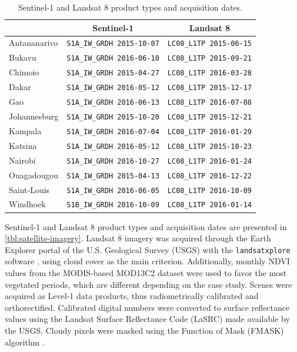 \documentclass[remotesensing,article,submit,moreauthors,pdftex,10pt,a4paper]{Definitions/mdpi}
\begin{document}
\begin{table}[H]
	\caption{Sentinel-1 and Landsat 8 product types and acquisition dates.}
	\centering
	\label{tbl:satellite-imagery}
	\begin{tabular}{lcc}
		\toprule
		             & \textbf{Sentinel-1}                & \textbf{Landsat 8} \\
		\midrule
		Antananarivo & \texttt{S1A\_IW\_GRDH\ 2015-10-07} &                    
		\texttt{LC08\_L1TP\ 2015-06-15}\tabularnewline
		Bukavu       & \texttt{S1A\_IW\_GRDH\ 2016-06-10} &                    
		\texttt{LC08\_L1TP\ 2015-09-21}\tabularnewline
		Chimoio      & \texttt{S1A\_IW\_GRDH\ 2015-04-27} &                    
		\texttt{LC08\_L1TP\ 2016-03-28}\tabularnewline
		Dakar        & \texttt{S1A\_IW\_GRDH\ 2016-05-12} &                    
		\texttt{LC08\_L1TP\ 2015-12-17}\tabularnewline
		Gao          & \texttt{S1A\_IW\_GRDH\ 2016-06-13} &                    
		\texttt{LC08\_L1TP\ 2016-07-08}\tabularnewline
		Johannesburg & \texttt{S1A\_IW\_GRDH\ 2015-10-20} &                    
		\texttt{LC08\_L1TP\ 2015-12-21}\tabularnewline
		Kampala      & \texttt{S1A\_IW\_GRDH\ 2016-07-04} &                    
		\texttt{LC08\_L1TP\ 2016-01-29}\tabularnewline
		Katsina      & \texttt{S1A\_IW\_GRDH\ 2016-05-12} &                    
		\texttt{LC08\_L1TP\ 2015-10-23}\tabularnewline
		Nairobi      & \texttt{S1A\_IW\_GRDH\ 2016-10-27} &                    
		\texttt{LC08\_L1TP\ 2016-01-24}\tabularnewline
		Ouagadougou  & \texttt{S1A\_IW\_GRDH\ 2015-04-13} &                    
		\texttt{LC08\_L1TP\ 2016-12-22}\tabularnewline
		Saint-Louis  & \texttt{S1A\_IW\_GRDH\ 2016-06-05} &                    
		\texttt{LC08\_L1TP\ 2016-10-09}\tabularnewline
		Windhoek     & \texttt{S1B\_IW\_GRDH\ 2016-10-09} &                    
		\texttt{LC08\_L1TP\ 2016-01-14}\tabularnewline
		\bottomrule
	\end{tabular}
\end{table}

Sentinel-1 and Landsat 8 product types and acquisition dates are presented in
\autoref{tbl:satellite-imagery}. Landsat 8 imagery was acquired through the
Earth Explorer portal of the U.S. Geological Survey (USGS) with the
\texttt{landsatxplore} software \cite{Forget2018}, using cloud cover as the main
criterion. Additionally, monthly NDVI values from the MODIS-based MOD13C2
dataset \cite{Didan2015} were used to favor the most vegetated periods, which
are different depending on the case study. Scenes were acquired as Level-1 data
products, thus radiometrically calibrated and orthorectified. Calibrated digital
numbers were converted to surface reflectance values using the Landsat Surface
Reflectance Code (LaSRC) \cite{Vermote2016} made available by the USGS. Cloudy
pixels were masked using the Function of Mask (FMASK) algorithm \cite{Zhu2012,
Zhu2015}.
\end{document}
